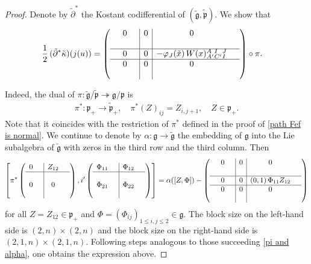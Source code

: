 \documentclass[11pt]{amsart}
\begin{document}
\begin{proof}
Denote by $\tilde\partial^*$ the Kostant codifferential of $(\tilde{\mathfrak g},\tilde{\mathfrak p})$. We show that
\begin{align}\label{AG Fef curvature Kostant}
\frac 1 2\,(\tilde\partial^*\tilde\kappa)(j(u))
&=
\left(\begin{array}{ccc|c|ccc}
	&0&&0&0&\\
 &&&&&\\
 \hline &0&&0&-\varphi_J(\tilde x)\,W(x){}^A_{A'}{}^I_{C'}{}^{J}_{I}&\\
	\hline&0&&0&0&\\
&& &&&\end{array}\right)\circ \pi.
\end{align}


Indeed, the dual of $\pi:\tilde{\mathfrak g}/\tilde{\mathfrak p}\twoheadrightarrow\mathfrak g/\mathfrak p$ is 
\begin{align*}
    \pi^*:\mathfrak p_+\to\tilde{\mathfrak p}_+,\quad \pi^*(Z)_{ij}=Z_{i,j+1},\quad Z\in\mathfrak p_+.
\end{align*}
Note that it coincides with the restriction of $\pi^*$ defined in the proof of \cref{path Fef is normal}. We continue to denote by $\alpha:\mathfrak g\to\tilde{\mathfrak g}$ the embedding of $\mathfrak g$ into the Lie subalgebra of $\tilde{\mathfrak g}$ with zeros in the third row and the third column. Then
\begin{align*}
    \left[\pi^*\left(\begin{array}{cc|cc}
	0&&Z_{12}&\\
 \hline&&&\\
	0&&0&\\
 &&&
\end{array}\right),i'\left(\begin{array}{cc|cc}
	\Phi_{11}&&\Phi_{12}&\\
 \hline&&&\\
	\Phi_{21}&&\Phi_{22}&\\
 &&&
\end{array}\right)\right]
=
\alpha([Z,\Phi])-\left(\begin{array}{ccc|c|ccc}
	&0&&0&0&\\
 &&&&&\\
 \hline &0&&0&(0,1)\,\Phi_{11}Z_{12}&\\
	\hline&0&&0&0&\\
&& &&&\end{array}\right)
\end{align*}
for all $Z=Z_{12}\in\mathfrak p_+$ and $\Phi=(\Phi_{ij})_{1\leq i,j\leq 2}\in\mathfrak g$. The block size on the left-hand side is $(2,n)\times(2,n)$ and the block size on the right-hand side is $(2,1,n)\times(2,1,n)$. Following steps analogous to those succeeding \eqref{pi and alpha}, one obtains the expression above.


\end{proof}
\end{document}
